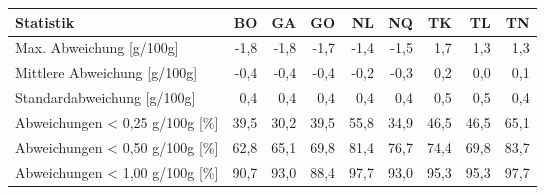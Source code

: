 \begin{tabular}{lrrrrrrrr}
\toprule
                     Statistik &   BO &   GA &   GO &   NL &   NQ &   TK &   TL &   TN \\
\midrule
      Max. Abweichung [g/100g] & -1,8 & -1,8 & -1,7 & -1,4 & -1,5 &  1,7 &  1,3 &  1,3 \\
  Mittlere Abweichung [g/100g] & -0,4 & -0,4 & -0,4 & -0,2 & -0,3 &  0,2 &  0,0 &  0,1 \\
  Standardabweichung [g/100g]  &  0,4 &  0,4 &  0,4 &  0,4 &  0,4 &  0,5 &  0,5 &  0,4 \\
Abweichungen < 0,25 g/100g [\%] & 39,5 & 30,2 & 39,5 & 55,8 & 34,9 & 46,5 & 46,5 & 65,1 \\
Abweichungen < 0,50 g/100g [\%] & 62,8 & 65,1 & 69,8 & 81,4 & 76,7 & 74,4 & 69,8 & 83,7 \\
Abweichungen < 1,00 g/100g [\%] & 90,7 & 93,0 & 88,4 & 97,7 & 93,0 & 95,3 & 95,3 & 97,7 \\
\bottomrule
\end{tabular}
